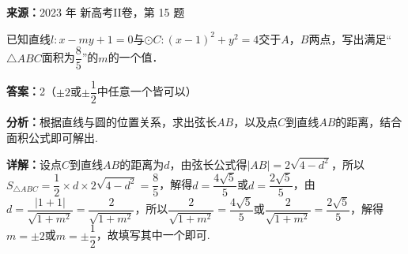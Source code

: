 \begin{question}[points=5]
\textbf{来源：}2023 年 新高考II卷，第 15 题\par
已知直线$l:x-my+1=0$与$\odot C:(x-1)^{2}+y^{2}=4$交于$A$，$B$两点，写出满足“$\triangle ABC$面积为$\dfrac{8}{5}$”的$m$的一个值．
\begin{solution}
\textbf{答案：}2（$\pm2$或$\pm\dfrac{1}{2}$中任意一个皆可以）

\textbf{分析：}根据直线与圆的位置关系，求出弦长$AB$，以及点$C$到直线$AB$的距离，结合面积公式即可解出.

\textbf{详解：}设点$C$到直线$AB$的距离为$d$，由弦长公式得$|AB|=2\sqrt{4-d^{2}}$，所以$S_{\triangle ABC}=\dfrac{1}{2}\times d\times2\sqrt{4-d^{2}}=\dfrac{8}{5}$，解得$d=\dfrac{4\sqrt{5}}{5}$或$d=\dfrac{2\sqrt{5}}{5}$，由$d=\dfrac{|1+1|}{\sqrt{1+m^{2}}}=\dfrac{2}{\sqrt{1+m^{2}}}$，所以$\dfrac{2}{\sqrt{1+m^{2}}}=\dfrac{4\sqrt{5}}{5}$或$\dfrac{2}{\sqrt{1+m^{2}}}=\dfrac{2\sqrt{5}}{5}$，解得$m=\pm2$或$m=\pm\dfrac{1}{2}$，故填写其中一个即可.
\end{solution}
\end{question}

